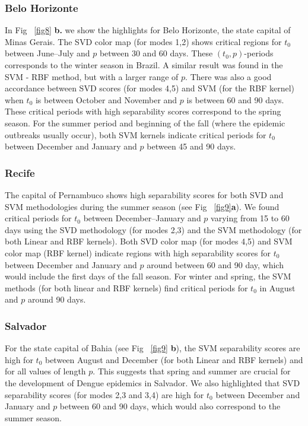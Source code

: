 \documentclass[final,leqno]{siamltexmm2}
\begin{document}
\subsubsection*{Belo Horizonte }
%
%
In Fig ~\ref{fig8} \textbf{b.} we show the highlights for Belo Horizonte, the state capital of 
Minas Gerais. The SVD color map (for modes 1,2) shows critical regions for $t_0$ between 
June--July and $p$ between 30 and 60 days. These $(t_0,p)$-periods corresponds to the winter season in Brazil. A similar result was found in the SVM - RBF method, but with a larger range of $p$. There was also a good accordance between SVD scores (for modes 4,5) and SVM (for the RBF kernel) when 
$t_0$ is between October and November and $p$ is between 60 and 90 days. These 
critical periods with high separability scores correspond to the spring season. For the summer period and beginning of the fall (where the epidemic outbreaks usually occur), both SVM kernels indicate critical 
periods for $t_0$ between December and January and $p$ between 45 and 90 days. 
%

%
\subsubsection*{Recife}
The capital of Pernambuco shows high separability scores for both 
SVD and SVM methodologies during the summer season (see Fig ~\ref{fig9}\textbf{a}).
We found critical periods for $t_0$ between December--January and $p$ varying from 
15 to 60 days using the SVD methodology (for modes 2,3) and the SVM methodology
(for both Linear and RBF kernels). Both SVD color map (for modes 4,5) and SVM 
color map (RBF kernel) indicate regions with high separability scores for 
$t_0$ between December and January and $p$ around between 60 and 90 day, which
would include the first days of the fall season. For winter and spring, the SVM methods
(for both linear and  RBF kernels) find critical periods for $t_0$ in August and $p$ 
around 90 days.
%
%
%
\subsubsection*{Salvador}
For the state capital of Bahia (see Fig ~\ref{fig9} \textbf{b}), the SVM separability 
scores are high for $t_0$ between August and December (for both  Linear and RBF kernels) 
and  for all values of length $p$.  This suggests that spring and summer are crucial for 
the development of Dengue epidemics in Salvador. We also highlighted that SVD separability
scores (for modes 2,3 and 3,4) are high for $t_0$ between December and January and
$p$ between 60 and 90 days, which would also correspond to the summer season.
%
%
%
\end{document}
